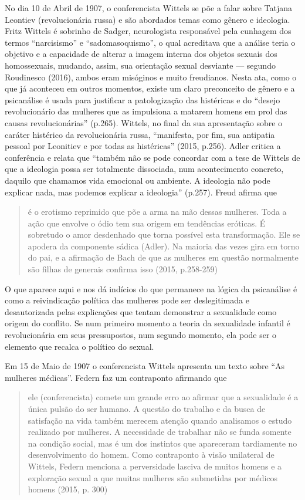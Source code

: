 No dia 10 de Abril de 1907, o conferencista Wittels se põe a falar sobre
Tatjana Leontiev (revolucionária russa) e são abordados temas como
gênero e ideologia. Fritz Wittels é sobrinho de Sadger, neurologista
responsável pela cunhagem dos termos ``narcisismo'' e
``sadomasoquismo'', o qual acreditava que a análise teria o objetivo e a
capacidade de alterar a imagem interna dos objetos sexuais dos
homossexuais, mudando, assim, sua orientação sexual desviante ---
segundo Roudinesco (2016), ambos eram misóginos e muito freudianos.
Nesta ata, como o que já aconteceu em outros momentos, existe um claro
preconceito de gênero e a psicanálise é usada para justificar a
patologização das histéricas e do ``desejo revolucionário das mulheres
que as impulsiona a matarem homens em prol das causas revolucionárias''
(p.265). Wittels, no final da sua apresentação sobre o caráter histérico
da revolucionária russa, ``manifesta, por fim, sua antipatia pessoal por
Leonitiev e por todas as histéricas'' (2015, p.256). Adler critica a
conferência e relata que ``também não se pode concordar com a tese de
Wittels de que a ideologia possa ser totalmente dissociada, num
acontecimento concreto, daquilo que chamamos vida emocional ou ambiente.
A ideologia não pode explicar nada, mas podemos explicar a ideologia''
(p.257). Freud afirma que

\begin{quote}
é o erotismo reprimido que põe a arma na mão dessas mulheres. Toda a
ação que envolve o ódio tem sua origem em tendências eróticas. É
sobretudo o amor desdenhado que torna possível esta transformação. Ele
se apodera da componente sádica (Adler). Na maioria das vezes gira em
torno do pai, e a afirmação de Bach de que as mulheres em questão
normalmente são filhas de generais confirma isso (2015, p.258-259)
\end{quote}

O que aparece aqui e nos dá indícios do que permanece na lógica da
psicanálise é como a reivindicação política das mulheres pode ser
deslegitimada e desautorizada pelas explicações que tentam demonstrar a
sexualidade como origem do conflito. Se num primeiro momento a teoria da
sexualidade infantil é revolucionária em seus pressupostos, num segundo
momento, ela pode ser o elemento que recalca o político do sexual.

Em 15 de Maio de 1907 o conferencista Wittels apresenta um texto sobre
``As mulheres médicas''. Federn faz um contraponto afirmando que

\begin{quote}
ele (conferencista) comete um grande erro ao afirmar que a sexualidade é
a única pulsão do ser humano. A questão do trabalho e da busca de
satisfação na vida também merecem atenção quando analisamos o estudo
realizado por mulheres. A necessidade de trabalhar não se funda somente
na condição social, mas é um dos instintos que apareceram tardiamente no
desenvolvimento do homem. Como contraponto à visão unilateral de
Wittels, Federn menciona a perversidade lasciva de muitos homens e a
exploração sexual a que muitas mulheres são submetidas por médicos
homens (2015, p. 300)
\end{quote}

